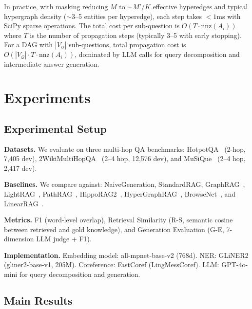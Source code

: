 \documentclass[11pt,a4paper]{article}
\begin{document}
In practice, with masking reducing $M$ to $\sim M' / K$ effective hyperedges and typical hypergraph density ($\sim$3--5 entities per hyperedge), each step takes $< 1$ms with SciPy sparse operations. The total cost per sub-question is $O(T \cdot \text{nnz}(A_i))$ where $T$ is the number of propagation steps (typically 3--5 with early stopping). For a DAG with $|V_\mathcal{Q}|$ sub-questions, total propagation cost is $O(|V_\mathcal{Q}| \cdot T \cdot \text{nnz}(A_i))$, dominated by LLM calls for query decomposition and intermediate answer generation.


\section{Experiments}

\subsection{Experimental Setup}

\textbf{Datasets.} We evaluate on three multi-hop QA benchmarks: HotpotQA~\cite{yang2018hotpotqa} (2-hop, 7,405 dev), 2WikiMultiHopQA~\cite{ho2020constructing} (2--4 hop, 12,576 dev), and MuSiQue~\cite{trivedi2022musique} (2--4 hop, 2,417 dev).

\textbf{Baselines.} We compare against: NaiveGeneration, StandardRAG, GraphRAG~\cite{edge2024graphrag}, LightRAG~\cite{guo2025lightrag}, PathRAG~\cite{chen2025pathrag}, HippoRAG2~\cite{gutierrez2025hipporag2}, HyperGraphRAG~\cite{luo2025hypergraphrag}, BrowseNet~\cite{browsenet2026}, and LinearRAG~\cite{linearrag2026}.

\textbf{Metrics.} F1 (word-level overlap), Retrieval Similarity (R-S, semantic cosine between retrieved and gold knowledge), and Generation Evaluation (G-E, 7-dimension LLM judge + F1).

\textbf{Implementation.} Embedding model: all-mpnet-base-v2 (768d). NER: GLiNER2 (gliner2-base-v1, 205M). Coreference: FastCoref (LingMessCoref). LLM: GPT-4o-mini for query decomposition and generation.

\subsection{Main Results}
\end{document}
